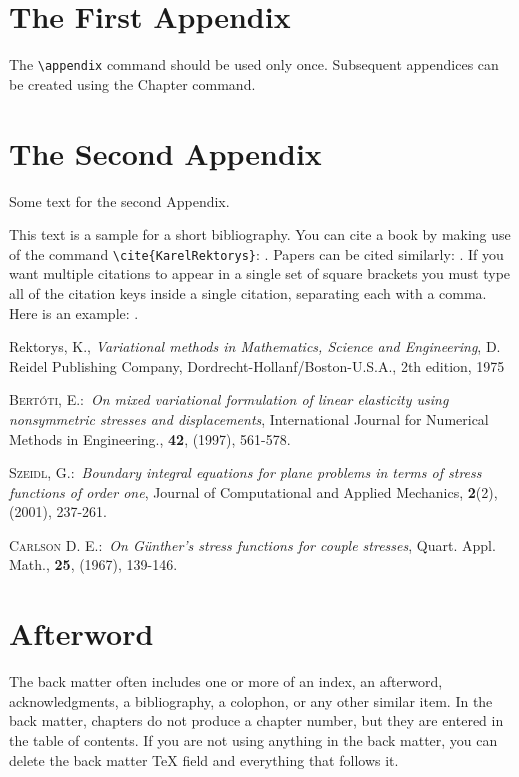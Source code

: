 \documentclass[letterpaper,12pt,openany,reqno]{book}%
\begin{document}
\appendix

\chapter{The First Appendix}

The \verb"\appendix" command should be used only once. Subsequent appendices can
be created using the Chapter command.

\chapter{The Second Appendix}

Some text for the second Appendix.

This text is a sample for a short bibliography. You can cite a book by making use of
the command \verb"\cite{KarelRektorys}": \cite{KarelRektorys}. Papers can be cited
similarly: \cite{Bertoti97}. If you want multiple citations to appear in a single set
of square brackets you must type all of the citation keys inside a single citation,
separating each with a comma. Here is an example: \cite{Bertoti97, Szeidl2001,
Carlson67}.

\begin{thebibliography}{9}
Rektorys, K., \textit{Variational methods in Mathematics,
Science and Engineering}, D. Reidel Publishing Company,
Dordrecht-Hollanf/Boston-U.S.A., 2th edition, 1975

 \textsc{Bert\'{o}ti, E.}:\ \textit{On mixed variational formulation
of linear elasticity using nonsymmetric stresses and displacements}, International
Journal for Numerical Methods in Engineering., \textbf{42}, (1997), 561-578.

 \textsc{Szeidl, G.}:\ \textit{Boundary integral equations for
plane problems in terms of stress functions of order one}, Journal of Computational and
Applied Mechanics, \textbf{2}(2), (2001), 237-261.

  \textsc{Carlson D. E.}:\ \textit{On G\"{u}nther's stress functions
for couple stresses}, Quart. Appl. Math., \textbf{25}, (1967), 139-146.
\end{thebibliography}

\backmatter

\chapter{Afterword}

The back matter often includes one or more of an index, an afterword,
acknowledgments, a bibliography, a colophon, or any other similar item. In
the back matter, chapters do not produce a chapter number, but they are
entered in the table of contents. If you are not using anything in the back
matter, you can delete the back matter TeX field and everything that follows it.
\end{document}
